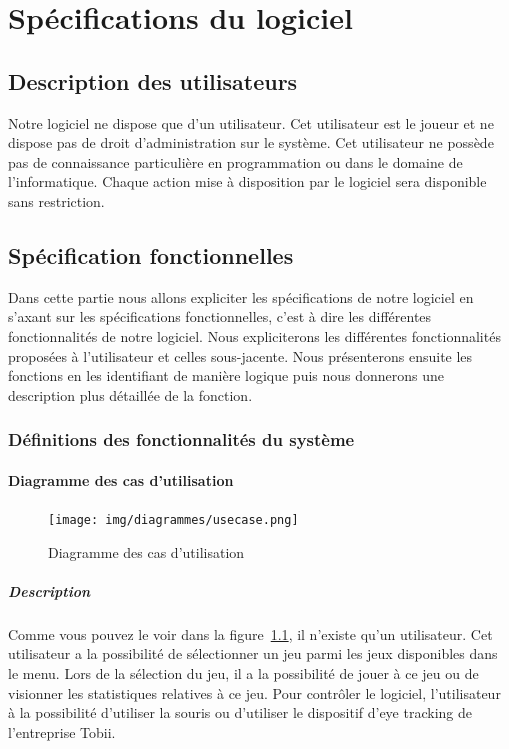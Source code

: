 \documentclass{polytech/polytech}
\begin{document}
\chapter{Spécifications du logiciel}
\section{Description des utilisateurs}
Notre logiciel ne dispose que d'un utilisateur. Cet utilisateur est le joueur et ne dispose pas de droit d'administration sur le système. Cet utilisateur ne possède pas de connaissance particulière en programmation ou dans le domaine de l'informatique. Chaque action mise à disposition par le logiciel sera disponible sans restriction.
\section{Spécification fonctionnelles}
Dans cette partie nous allons expliciter les spécifications de notre logiciel en s'axant sur les spécifications fonctionnelles, c'est à dire les différentes fonctionnalités de notre logiciel. Nous expliciterons les différentes fonctionnalités proposées à l'utilisateur et celles sous-jacente. Nous présenterons ensuite les fonctions en les identifiant de manière logique puis nous donnerons une description plus détaillée de la fonction. 

\subsection{Définitions des fonctionnalités du système}

\subsubsection{Diagramme des cas d'utilisation}

\begin{figure}
    \centering
    \texttt{[image: img/diagrammes/usecase.png]}
    \caption{Diagramme des cas d'utilisation}
    \label{fig:use_case}
\end{figure}
\pagebreak

\paragraph{Description}
Comme vous pouvez le voir dans la figure~\ref{fig:use_case}, il n'existe qu'un utilisateur. Cet utilisateur a la possibilité de sélectionner un jeu parmi les jeux disponibles dans le menu. Lors de la sélection du jeu, il a la possibilité de jouer à ce jeu ou de visionner les statistiques relatives à ce jeu. Pour contrôler le logiciel, l'utilisateur à la possibilité d'utiliser la souris ou d'utiliser le dispositif d'eye tracking de l'entreprise Tobii. 
\end{document}
